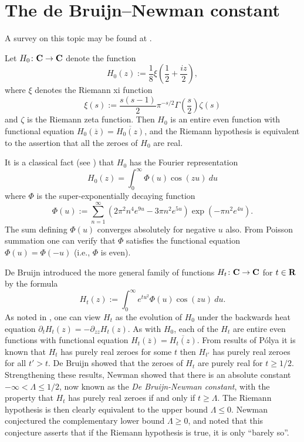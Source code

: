 \chapter{The de Bruijn--Newman constant}\label{debruijn-newman-chapter}

A survey on this topic may be found at \cite{newman-wu-survey}.

Let $H_0 \colon \mathbf{C} \to \mathbf{C}$ denote the function
\begin{equation}\label{hoz}
 H_0(z) := \frac{1}{8} \xi\left(\frac{1}{2} + \frac{iz}{2}\right),
\end{equation}
where $\xi$ denotes the Riemann xi function
\begin{equation}\label{sas}
 \xi(s) := \frac{s(s-1)}{2} \pi^{-s/2} \Gamma\left(\frac{s}{2}\right) \zeta(s)
\end{equation}
and $\zeta$ is the Riemann zeta function.
Then $H_0$ is an entire even function with functional equation $H_0(\overline{z}) = \overline{H_0(z)}$, and the Riemann hypothesis is equivalent to the assertion that all the zeroes of $H_0$ are real.

It is a classical fact (see \cite[p. 255]{titchmarsh_theory_1986}) that $H_0$ has the Fourier representation
$$ H_0(z) = \int_0^\infty \Phi(u) \cos(zu)\ du$$
where $\Phi$ is the super-exponentially decaying function
\begin{equation}\label{phidef}
 \Phi(u) := \sum_{n=1}^\infty (2\pi^2  n^4 e^{9u} - 3\pi n^2 e^{5u} ) \exp(-\pi n^2 e^{4u} ).
\end{equation}
The sum defining $\Phi(u)$ converges absolutely for negative $u$ also.  From Poisson summation one can verify that $\Phi$ satisfies the functional equation $\Phi(u) = \Phi(-u)$ (i.e., $\Phi$ is even).

De Bruijn \cite{debr} introduced the more general family of functions $H_t \colon \mathbf{C} \to \mathbf{C}$ for $t \in \mathbf{R}$ by the formula
\begin{equation}\label{htdef}
 H_t(z) := \int_0^\infty e^{tu^2} \Phi(u) \cos(zu)\ du.
\end{equation}
As noted in \cite[p.114]{csv}, one can view $H_t$ as the evolution of $H_0$ under the backwards heat equation $\partial_t H_t(z)= -\partial_{zz} H_t(z)$.
As with $H_0$, each of the $H_t$ are entire even functions with functional equation $H_t(\overline{z}) = \overline{H_t(z)}$.  From results of P\'olya \cite{polya} it is known that $H_t$ has purely real zeroes for some $t$ then $H_{t'}$ has purely real zeroes for all $t'>t$.
De Bruijn showed that the zeroes of $H_t$ are purely real for $t \geq 1/2$.  Strengthening these results, Newman \cite{newman} showed that there is an absolute constant $-\infty < \Lambda \leq 1/2$, now known as the \emph{De Bruijn-Newman constant}, with the property that $H_t$ has purely real zeroes if and only if $t \geq \Lambda$.  The Riemann hypothesis is then clearly equivalent to the upper bound $\Lambda \leq 0$.  Newman conjectured the complementary lower bound $\Lambda \geq 0$, and noted that this conjecture asserts that if the Riemann hypothesis is true, it is only ``barely so''.

